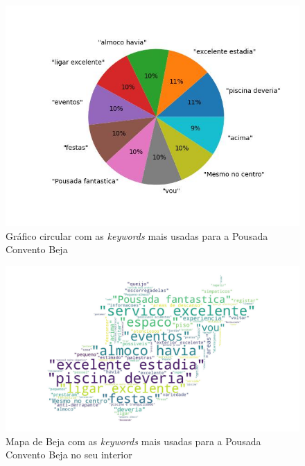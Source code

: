 \begin{figure}[!htb]
\centering
\includegraphics[width=14cm]{figuras/TripAdvisor/Hotels/hotel0_keywords.jpeg}
\caption{Gráfico circular com as \textit{keywords} mais usadas para a Pousada Convento Beja}
\label{fig:top10keywpcbeja}
\end{figure}

\begin{figure}[!htb]
\centering
\includegraphics[width=14cm]{figuras/TripAdvisor/Hotels/hotel0_keywordcloud.jpeg}
\caption{Mapa de Beja com as \textit{keywords} mais usadas para a Pousada Convento Beja no seu interior}
\label{fig:top100keywcpcbeja}
\end{figure}

